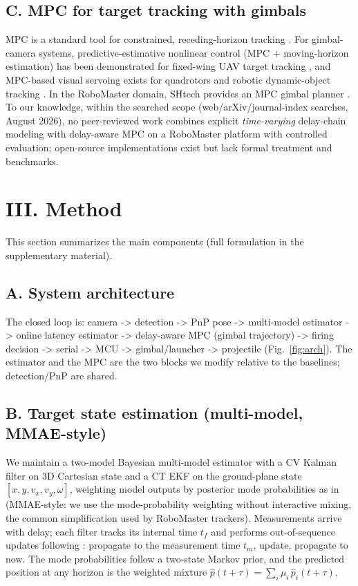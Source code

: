 \documentclass[journal]{IEEEtran}
\begin{document}
\subsection*{C. MPC for target tracking with gimbals}

MPC is a standard tool for constrained, receding-horizon tracking \cite{ref18}. For gimbal-camera systems, predictive-estimative nonlinear control (MPC + moving-horizon estimation) has been demonstrated for fixed-wing UAV target tracking \cite{ref11}, and MPC-based visual servoing exists for quadrotors \cite{ref14} and robotic dynamic-object tracking \cite{ref15}. In the RoboMaster domain, SHtech provides an MPC gimbal planner \cite{ref3}. To our knowledge, within the searched scope (web/arXiv/journal-index searches, August 2026), no peer-reviewed work combines explicit \textit{time-varying} delay-chain modeling with delay-aware MPC on a RoboMaster platform with controlled evaluation; open-source implementations exist but lack formal treatment and benchmarks.
\section*{III. Method}

This section summarizes the main components (full formulation in the supplementary material).

\subsection*{A. System architecture}

The closed loop is: camera -> detection -> PnP pose -> multi-model estimator -> online latency estimator -> delay-aware MPC (gimbal trajectory) -> firing decision -> serial -> MCU -> gimbal/launcher -> projectile (Fig.~\ref{fig:arch}). The estimator and the MPC are the two blocks we modify relative to the baselines; detection/PnP are shared.

\subsection*{B. Target state estimation (multi-model, MMAE-style)}

We maintain a two-model Bayesian multi-model estimator with a CV Kalman filter on 3D Cartesian state and a CT EKF on the ground-plane state $[x,y,v_x,v_y,\omega]$, weighting model outputs by posterior mode probabilities as in \cite{ref16} (MMAE-style: we use the mode-probability weighting without interactive mixing, the common simplification used by RoboMaster trackers). Measurements arrive with delay; each filter tracks its internal time $t_f$ and performs out-of-sequence updates following \cite{ref17}: propagate to the measurement time $t_m$, update, propagate to now. The mode probabilities follow a two-state Markov prior, and the predicted position at any horizon is the weighted mixture $\hat p(t+\tau)=\sum_i \mu_i\,\hat p_i(t+\tau)$.
\end{document}

